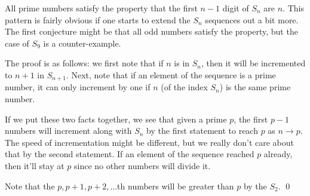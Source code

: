\documentclass[11pt]{book} %
\begin{document}
\begin{Exercise}
All prime numbers satisfy the property that the first $n-1$ digit of $S_n$ are $n$. This pattern is fairly obvious if one
starts to extend the $S_n$ sequences out a bit more. The first conjecture might be that all odd numbers satisfy the property,
but the case of $S_9$ is a counter-example. 

The proof is as follows: we first note that if $n$ is in $S_n$, then it will be incremented to $n+1$ in $S_{n+1}$. 
Next, note that if an element of the sequence is a prime number, it can only increment by one if $n$ (of the index $S_n$)
 is the same prime number.

If we put these two facts together, we see that given a prime $p$, the first $p-1$ numbers will increment along with $S_n$ by
the first statement to reach $p$ as $n \rightarrow p$. 
The speed of incrementation might be different, but we really don't care about that by the second statement. 
If an element of the sequence reached $p$ already, then it'll stay at $p$ since no other numbers will divide it.

Note that the $p, p+1, p+2, \ldots$th numbers will be greater than $p$ by the $S_2$. \qed
\end{Exercise}
\end{document}
